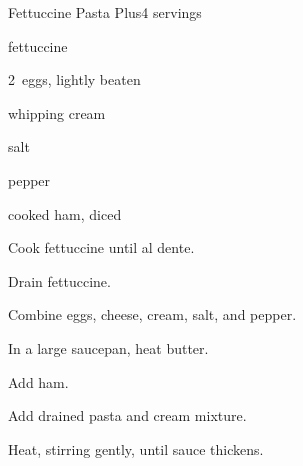 \begin{recipe}{Fettuccine Pasta Plus}{}{4 servings}

\begin{ingredients}
\item {} fettuccine
\item 2~eggs, lightly beaten
\item \C{\twothird} 
\item {} whipping cream
\item salt
\item pepper
\item {}
\item {} cooked ham, diced
\end{ingredients}

\begin{directions}
\item Cook fettuccine until al dente.
\item Drain fettuccine.
\item Combine eggs, cheese, cream, salt, and pepper.
\item In a large saucepan, heat butter.
\item Add ham.
\item Add drained pasta and cream mixture.
\item Heat, stirring gently, until sauce thickens.
\end{directions}

\end{recipe}
